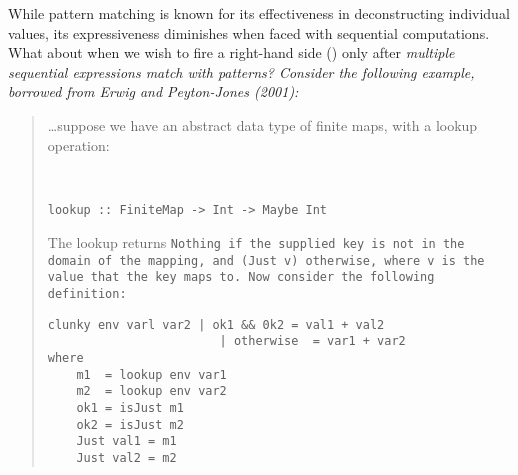 \documentclass[manuscript,screen,review, 12pt]{acmart}
\begin{document}
\begin{outline}[enumerate]
    



            While pattern matching is known for its effectiveness in
            deconstructing individual values, its expressiveness diminishes when
            faced with sequential computations. What about when we wish to fire
            a right-hand side () only after \it{multiple
            sequential expressions} match with patterns? Consider the following
            example, borrowed from Erwig and Peyton-Jones (2001): 

    \begin{quote}
    
    \dots suppose we have an abstract data type of finite maps, with a lookup
    operation:

        \begin{verbatim}


lookup :: FiniteMap -> Int -> Maybe Int
        \end{verbatim}

        The lookup returns \tt{Nothing} if the supplied key is not in the domain of
    the mapping, and \tt{(Just v)} otherwise, where \tt{v} is the value that the
    key maps to. Now consider the following definition:


    \begin{minipage}{\textwidth}
        \begin{verbatim}
clunky env varl var2 | ok1 && 0k2 = val1 + val2 
                        | otherwise  = var1 + var2 
where 
    m1  = lookup env var1 
    m2  = lookup env var2
    ok1 = isJust m1 
    ok2 = isJust m2 
    Just val1 = m1 
    Just val2 = m2    
        \end{verbatim}        
    \end{minipage}
        

\end{quote}
\end{outline}
\end{document}

